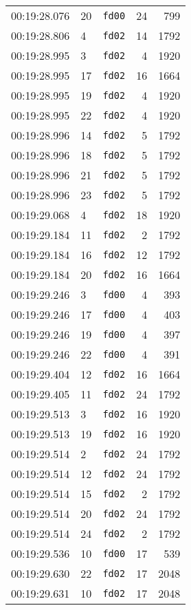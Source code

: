 \documentclass{article}
\begin{document}
\begin{longtable}{lllrr}
00:19:28.076 & 20 & \texttt{fd00} & 24 & 799 \\
00:19:28.806 & 4 & \texttt{fd02} & 14 & 1792 \\
00:19:28.995 & 3 & \texttt{fd02} & 4 & 1920 \\
00:19:28.995 & 17 & \texttt{fd02} & 16 & 1664 \\
00:19:28.995 & 19 & \texttt{fd02} & 4 & 1920 \\
00:19:28.995 & 22 & \texttt{fd02} & 4 & 1920 \\
00:19:28.996 & 14 & \texttt{fd02} & 5 & 1792 \\
00:19:28.996 & 18 & \texttt{fd02} & 5 & 1792 \\
00:19:28.996 & 21 & \texttt{fd02} & 5 & 1792 \\
00:19:28.996 & 23 & \texttt{fd02} & 5 & 1792 \\
00:19:29.068 & 4 & \texttt{fd02} & 18 & 1920 \\
00:19:29.184 & 11 & \texttt{fd02} & 2 & 1792 \\
00:19:29.184 & 16 & \texttt{fd02} & 12 & 1792 \\
00:19:29.184 & 20 & \texttt{fd02} & 16 & 1664 \\
00:19:29.246 & 3 & \texttt{fd00} & 4 & 393 \\
00:19:29.246 & 17 & \texttt{fd00} & 4 & 403 \\
00:19:29.246 & 19 & \texttt{fd00} & 4 & 397 \\
00:19:29.246 & 22 & \texttt{fd00} & 4 & 391 \\
00:19:29.404 & 12 & \texttt{fd02} & 16 & 1664 \\
00:19:29.405 & 11 & \texttt{fd02} & 24 & 1792 \\
00:19:29.513 & 3 & \texttt{fd02} & 16 & 1920 \\
00:19:29.513 & 19 & \texttt{fd02} & 16 & 1920 \\
00:19:29.514 & 2 & \texttt{fd02} & 24 & 1792 \\
00:19:29.514 & 12 & \texttt{fd02} & 24 & 1792 \\
00:19:29.514 & 15 & \texttt{fd02} & 2 & 1792 \\
00:19:29.514 & 20 & \texttt{fd02} & 24 & 1792 \\
00:19:29.514 & 24 & \texttt{fd02} & 2 & 1792 \\
00:19:29.536 & 10 & \texttt{fd00} & 17 & 539 \\
00:19:29.630 & 22 & \texttt{fd02} & 17 & 2048 \\
00:19:29.631 & 10 & \texttt{fd02} & 17 & 2048 \\

\end{longtable}
\end{document}
